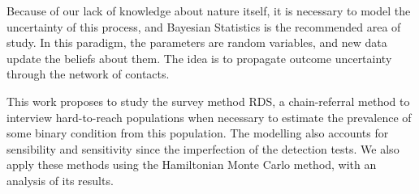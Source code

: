 Because of our lack of knowledge about nature itself, it is necessary to model
the uncertainty of this process, and Bayesian Statistics is the recommended
area of study. In this paradigm, the parameters are random variables, and new
data update the beliefs about them. The idea is to propagate outcome
uncertainty through the network of contacts. 

This work proposes to study the survey method RDS, a chain-referral method to
interview hard-to-reach populations when necessary to estimate the prevalence
of some binary condition from this population. The modelling also accounts for
sensibility and sensitivity since the imperfection of the detection tests. We
also apply these methods using the Hamiltonian Monte Carlo method, with an
analysis of its results.